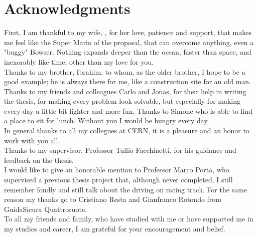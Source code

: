 \chapter*{Acknowledgments}

First, I am thankful to my wife, , for her love, patience and support, that makes me feel like the Super Mario of the proposal, that can overcome anything, even a "buggy" Bowser. Nothing expands deeper than the ocean, faster than space, and inexorably like time, other than my love for you.\\
Thanks to my brother, Ibrahim, to whom, as the older brother, I hope to be a good example; he is always there for me, like a construction site for an old man.
Thanks to my friends and colleagues Carlo and Jonas, for their help in writing the thesis, for making every problem look solvable, but especially for making every day a little bit lighter and more fun. 
Thanks to Simone who is able to find a place to sit for lunch. Without you I would be hungry every day.\\
In general thanks to all my collegues at CERN, it is a pleasure and an honor to work with you all.\\
Thanks to my supervisor, Professor Tullio Facchinetti, for his guidance and feedback on the thesis.\\
I would like to give an honorable mention to Professor Marco Porta, who supervised a previous thesis project that, although never completed, I still remember fondly and still talk about the driving on racing track. For the same reason my thanks go to Cristiano Resta and Gianfranco Rotondo from GuidaSicura Quattroruote.\\
To all my friends and family, who have studied with me or have supported me in my studies and career, I am grateful for your encouragement and belief.\\

\thispagestyle{empty}
\mbox{}
\newpage
